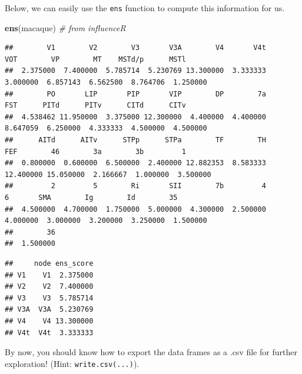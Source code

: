 \documentclass[
]{book}
\newenvironment{Shaded}{\begin{snugshade}}{\end{snugshade}}
\newcommand{\AttributeTok}[1]{\textcolor[rgb]{0.13,0.29,0.53}{#1}}
\newcommand{\CommentTok}[1]{\textcolor[rgb]{0.56,0.35,0.01}{\textit{#1}}}
\newcommand{\FunctionTok}[1]{\textcolor[rgb]{0.13,0.29,0.53}{\textbf{#1}}}
\newcommand{\NormalTok}[1]{#1}
\newcommand{\OtherTok}[1]{\textcolor[rgb]{0.56,0.35,0.01}{#1}}
\newcommand{\SpecialCharTok}[1]{\textcolor[rgb]{0.81,0.36,0.00}{\textbf{#1}}}
\begin{document}
Below, we can easily use the \texttt{ens} function to compute this information for us.

\begin{Shaded}
\begin{Highlighting}[]
\FunctionTok{ens}\NormalTok{(macaque) }\CommentTok{\# from influenceR}
\end{Highlighting}
\end{Shaded}

\begin{verbatim}
##        V1        V2        V3       V3A        V4       V4t       VOT        VP        MT    MSTd/p      MSTl 
##  2.375000  7.400000  5.785714  5.230769 13.300000  3.333333  3.000000  6.857143  6.562500  8.764706  1.250000 
##        PO       LIP       PIP       VIP        DP        7a       FST      PITd      PITv      CITd      CITv 
##  4.538462 11.950000  3.375000 12.300000  4.400000  4.400000  8.647059  6.250000  4.333333  4.500000  4.500000 
##      AITd      AITv      STPp      STPa        TF        TH       FEF        46        3a        3b         1 
##  0.800000  0.600000  6.500000  2.400000 12.882353  8.583333 12.400000 15.050000  2.166667  1.000000  3.500000 
##         2         5        Ri       SII        7b         4         6       SMA        Ig        Id        35 
##  4.500000  4.700000  1.750000  5.000000  4.300000  2.500000  4.000000  3.000000  3.200000  3.250000  1.500000 
##        36 
##  1.500000
\end{verbatim}

\begin{Shaded}
\end{Shaded}

\begin{verbatim}
##     node ens_score
## V1    V1  2.375000
## V2    V2  7.400000
## V3    V3  5.785714
## V3A  V3A  5.230769
## V4    V4 13.300000
## V4t  V4t  3.333333
\end{verbatim}

By now, you should know how to export the data frames as a .csv file for further exploration! (Hint: \texttt{write.csv(...)}).
\end{document}
